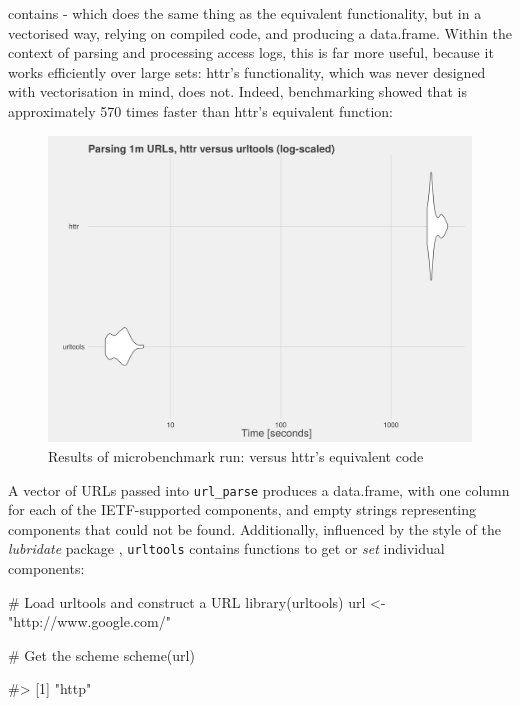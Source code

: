  contains  - which does the same thing as
the equivalent  functionality, but in a vectorised way,
relying on compiled code, and producing a data.frame. Within the context
of parsing and processing access logs, this is far more useful, because
it works efficiently over large sets: httr's functionality, which was
never designed with vectorisation in mind, does not. Indeed,
benchmarking showed that  is approximately 570 times
faster than httr's equivalent function:

\begin{figure}[h]
    \centering
    \includegraphics[scale=0.4]{parsing_benchmarks}
    \caption{Results of microbenchmark run:  versus httr's equivalent code}
\end{figure}

\newpage

A vector of URLs passed into \texttt{url\_parse} produces a data.frame,
with one column for each of the IETF-supported components, and empty
strings representing components that could not be found. Additionally,
influenced by the style of the \emph{lubridate} package
\citep{lubridate}, \texttt{urltools} contains functions to get or
\emph{set} individual components:

\begin{Schunk}
\begin{Sinput}
# Load urltools and construct a URL
library(urltools)
url <- "http://www.google.com/"

# Get the scheme
scheme(url)
\end{Sinput}
\begin{Soutput}
#> [1] "http"
\end{Soutput}
\end{Schunk}

